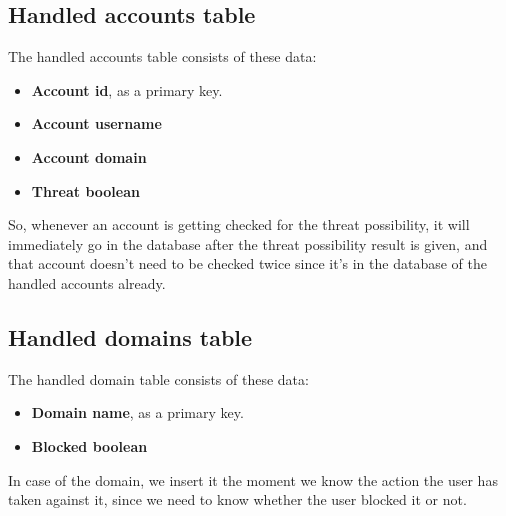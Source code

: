\subsection{Handled accounts table}\label{ss:hand_acc}
The handled accounts table consists of these data:
\begin{itemize}
	\item \textbf{Account id}, as a primary key.
	\item \textbf{Account username}
	\item \textbf{Account domain}
	\item \textbf{Threat boolean}
\end{itemize}
So, whenever an account is getting checked for the threat possibility, it will immediately go in the database
after the threat possibility result is given, and that account doesn't need to be checked twice since it's in the database
of the handled accounts already.
\subsection{Handled domains table}
The handled domain table consists of these data:
\begin{itemize}
	\item \textbf{Domain name}, as a primary key.
	\item \textbf{Blocked boolean}
\end{itemize}
In case of the domain, we insert it the moment we know the action the user has taken against it, since we need to know whether the user blocked it or not.
